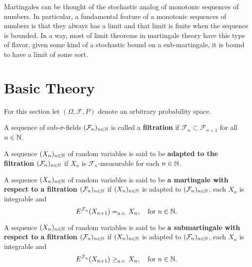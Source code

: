 

Martingales can be thought of the stochastic analog of monotonic sequences of numbers. In particular,  a fundamental feature of a monotonic sequences of numbers is that they always has a limit and that limit is finite when the sequence is bounded. In a way, most of limit theorems in martingale theory have this type of flavor, given some kind of a stochastic bound on a sub-martingale, it is bound to have  a limit of some sort.


%
%
\section{Basic Theory}


\begin{sectionassumption}
For this section let $(\Omega, \mathcal F, P)$ denote an arbitrary probability space.
\end{sectionassumption}

\begin{definition}
A sequence of sub-$\sigma$-fields $(\mathcal F_n)_{n\in\Bbb N}$ is called a {\bf filtration} if $\mathcal F_n\subset \mathcal F_{n+1}$ for all $n\in\Bbb N$.
\end{definition}

\begin{definition}
A sequence $(X_n)_{n\in\Bbb N}$ of random variables is said to be {\bf adapted to the filtration $(\mathcal F_n)_{n\in\Bbb N}$} if $X_n$ is $\mathcal F_n$-measurable for each $n\in \Bbb N$.
\end{definition}

\begin{definition}
A sequence $(X_n)_{n\in\Bbb N}$ of random variables is said to be {\bf a martingale with respect to a filtration $(\mathcal F_n)_{n\in\Bbb N}$} if $(X_n)_{n\in\Bbb N}$ is adapted to $(\mathcal F_n)_{n\in\Bbb N}$, each $X_n$ is integrable and
\[  E^{\mathcal F_n}(X_{n+1})=_{\tiny a.e.} X_n ,\quad\text{for $n\in \Bbb N$}. \]
\end{definition}



\begin{definition}
A sequence $(X_n)_{n\in\Bbb N}$ of random variables is said to be {\bf a submartingale with respect to a filtration $(\mathcal F_n)_{n\in\Bbb N}$} if $(X_n)_{n\in\Bbb N}$ is adapted to $(\mathcal F_n)_{n\in\Bbb N}$, each $X_n$ is integrable and
\[ E^{\mathcal F_n} (X_{n+1})  \geq_{\tiny a.e.} X_n,\quad\text{for $n\in \Bbb N$}. \]
\end{definition}




